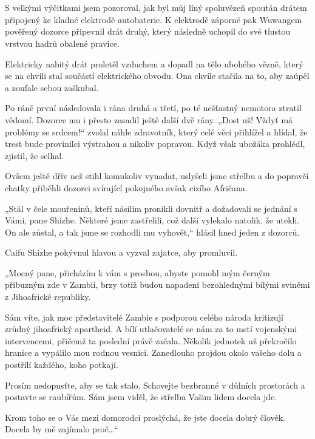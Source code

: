 \chapter{}
S velkými výčitkami jsem pozoroval, jak byl můj líný spoluvězeň spoután drátem připojený ke kladné elektrodě autobaterie. K elektrodě záporné pak Wuwangem pověřený dozorce připevnil drát druhý, který následně uchopil do své tlustou vrstvou hadrů obalené pravice.
	
 Elektricky nabitý drát proletěl vzduchem a dopadl na tělo ubohého vězně, který se na chvíli stal součástí elektrického obvodu. Ona chvíle stačila na to, aby zaúpěl a zoufale sebou zaškubal.
	
 Po ráně první následovala i rána druhá a třetí, po té nešťastný nemotora ztratil vědomí. Dozorce mu i přesto zasadil ještě další dvě rány. „Dost už! Vždyť má problémy se srdcem!“ zvolal náhle zdravotník, který celé věci přihlížel a hlídal, že trest bude provinilci výstrahou a nikoliv popravou. Když však ubožáka prohlédl, zjistil, že selhal. 
	
 Ovšem ještě dřív než stihl komukoliv vynadat, uslyšeli jsme střelbu a do popravčí chatky přiběhli dozorci svírající pokojného avšak cizího Afričana. 

„Stál v čele mouřenínů, kteří násilím pronikli dovnitř a dožadovali se jednání s Vámi, pane Shizhe. Některé jsme zastřelili, což další vylekalo natolik, že utekli. On ale zůstal, a tak jsme se rozhodli mu vyhovět,“ hlásil hned jeden z dozorců.
	
 Caifu Shizhe pokývnul hlavou a vyzval zajatce, aby promluvil.
	
 „Mocný pane, přicházím k vám s prosbou, abyste pomohl mým černým příbuzným zde v Zambii, brzy totiž budou napadeni bezohlednými bílými sviněmi z Jihoafrické republiky.
	
 Sám víte, jak moc představitelé Zambie s podporou celého národa kritizují zrůdný jihoafrický apartheid. A bílí utlačovatelé se nám za to mstí vojenskými intervencemi, přičemž ta poslední právě začala. Několik jednotek už překročilo hranice a vypálilo mou rodnou vesnici. Zanedlouho projdou okolo vašeho dolu a postřílí každého, koho potkají.
	
 Prosím nedopusťte, aby se tak stalo. Schovejte bezbranné v důlních prostorách a postavte se raubířům. Sám jsem viděl, že střelba Vašim lidem docela jde.
	
 Krom toho se o Vás mezi domorodci proslýchá, že jste docela dobrý člověk. Docela by mě zajímalo proč…“ 

